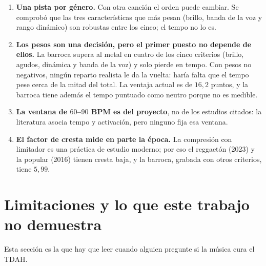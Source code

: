 \documentclass[11pt,a4paper]{article}
\begin{document}
\begin{enumerate}
  \item \textbf{Una pista por género.} Con otra canción el orden puede cambiar.
        Se comprobó que las tres características que más pesan (brillo, banda
        de la voz y rango dinámico) son robustas entre los cinco; el tempo no
        lo es.
  \item \textbf{Los pesos son una decisión, pero el primer puesto no depende
        de ellos.} La barroca supera al metal en cuatro de los cinco criterios
        (brillo, agudos, dinámica y banda de la voz) y solo pierde en tempo. Con
        pesos no negativos, ningún reparto realista le da la vuelta: haría
        falta que el tempo pese cerca de la mitad del total. La ventaja actual es de
        \(16{,}2\) puntos, y la barroca tiene además el tempo puntuado como
        neutro porque no es medible.
  \item \textbf{La ventana de \(60\)--\(90\) BPM es del proyecto}, no de los
        estudios citados: la literatura asocia tempo y activación, pero ninguno
        fija esa ventana.
  \item \textbf{El factor de cresta mide en parte la época.} La compresión con
        limitador es una práctica de estudio moderno; por eso el reggaetón
        (2023) y la popular (2016) tienen cresta baja, y la barroca, grabada con
        otros criterios, tiene \(5{,}99\).
\end{enumerate}

\section{Limitaciones y lo que este trabajo no demuestra}\label{sec:limites}

Esta sección es la que hay que leer cuando alguien pregunte si la música cura
el TDAH.
\end{document}
